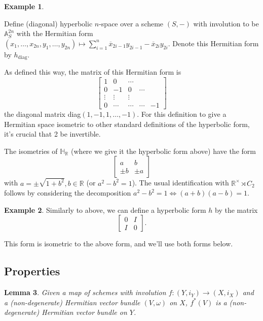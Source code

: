 \documentclass[edeposit,fullpage]{uiucthesis2009}
\newcommand{\mbb}{\mathbb}
\theoremstyle{plain}
\newtheorem{lemma}{Lemma}
\numberwithin{lemma}{section}
\theoremstyle{definition}
\newtheorem{example}[lemma]{Example}
\begin{document}
\begin{example}\label{ex:hyp_space}

Define (diagonal) hyperbolic $n$-space over a scheme $(S,-)$ with involution to be $\mbb A^{2n}_S$
with the Hermitian form $(x_1,\dots,x_{2n},y_1,\dots,y_{2n}) \mapsto
\sum_{i=1}^n  \overline x_{2i-1} y_{2i-1} -  \overline x_{2i}
y_{2i}$. Denote this Hermitian form by $h_{\mathrm{diag}}$.

As defined this way, the matrix of this Hermitian form is
\[
\begin{bmatrix}
1 & 0 & \cdots \\
0 & -1 & 0 & \cdots \\
\vdots & \vdots & \vdots \\
0 & \cdots & \cdots & \cdots & -1
\end{bmatrix}
\]
the diagonal matrix diag$(1,-1,1,\dots,-1)$. For this definition to
give a Hermitian space isometric to other standard definitions of the
hyperbolic form, it's crucial that 2 be invertible. 

The isometries of $\mbb H_{\mbb R}$ (where we give it the hyperbolic
form above) have the form
\[
\begin{bmatrix}
a & b\\
\pm b & \pm a
\end{bmatrix}
\]
with $a = \pm\sqrt{1 + b^2}, b \in \mbb R$ (or $a^2 - b^2 = 1$). The
usual identification with $\mbb R^\times \rtimes C_2$ follows by
considering the decomposition $a^2 - b^2 = 1 \iff (a+b)(a-b) = 1$.
\end{example}

\begin{example}
Similarly to above, we can define a hyperbolic form $h$ by the matrix
\[
\begin{bmatrix}
0 & I\\
I & 0
\end{bmatrix}.
\]

This form is isometric to the above form, and we'll use both forms below.
\end{example}

\subsection{Properties}

\begin{lemma}
Given a map of schemes with involution $f : (Y,i_Y) \rightarrow (X,i_X)$
and a (non-degenerate) Hermitian vector bundle $(V,\omega)$ on $X$, $f^*(V)$ is
a (non-degenerate) Hermitian
vector bundle on $Y$.
\end{lemma}
\end{document}
